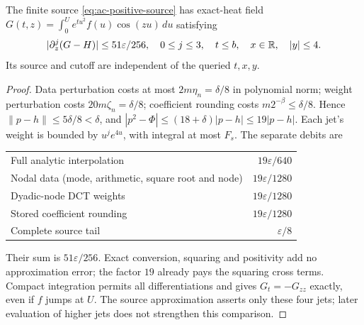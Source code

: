 \begin{theorem}
\label{thm:ac-source}
The finite source \eqref{eq:ac-positive-source} has exact-heat field
$G(t,z)=\int_0^Ue^{tu^2}f(u)\cos(zu)\,du$ satisfying
\begin{equation}
 |\partial_z^j(G-H)|\le51\varepsilon/256,
 \quad 0\le j\le3,\quad t\le b,\quad x\in\mathbb R,\quad |y|\le4.
 \label{eq:ac-four-jets}
\end{equation}
Its source and cutoff are independent of the queried $t,x,y$.
\end{theorem}
\begin{proof}
Data perturbation costs at most $2m\eta_n=\delta/8$ in polynomial
norm; weight perturbation costs $20m\zeta_n=\delta/8$; coefficient
rounding costs $m2^{-\beta}\le\delta/8$. Hence
$\|p-h\|\le5\delta/8<\delta$, and
$|p^2-\Phi|\le(18+\delta)|p-h|\le19|p-h|$.
Each jet's weight is bounded by $u^je^{4u}$, with integral at most
$F_s$. The separate debits are
\begin{center}\small
\begin{tabular}{@{}lr@{}}\toprule
Full analytic interpolation & $19\varepsilon/640$\\
Nodal data (mode, arithmetic, square root and node) & $19\varepsilon/1280$\\
Dyadic-node DCT weights & $19\varepsilon/1280$\\
Stored coefficient rounding & $19\varepsilon/1280$\\
Complete source tail & $\varepsilon/8$\\\bottomrule
\end{tabular}
\end{center}
Their sum is $51\varepsilon/256$. Exact conversion, squaring and
positivity add no approximation error; the factor $19$ already pays
the squaring cross terms. Compact integration permits all
differentiations and gives $G_t=-G_{zz}$ exactly, even if $f$ jumps
at $U$. The source approximation asserts only these four jets;
later evaluation of higher jets does not strengthen this comparison.
\end{proof}

